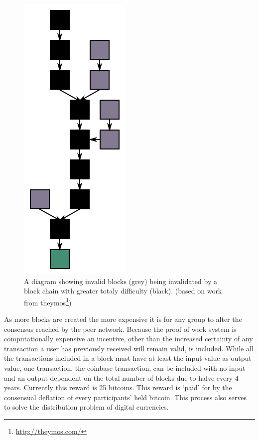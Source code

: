 \begin{figure}[t!]
    \centering
    \includegraphics[height=\columnwidth]{img/Blockchain}
    \caption{A diagram showing invalid blocks (grey) being invalidated by a block chain with greater totaly difficulty (black). (based on work from theymos\protect\footnote{\url{http://theymos.com/}})}
    \label{fig:blockchain}
\end{figure}

As more blocks are created the more expensive it is for any group to alter the consensus reached by the peer network.  Because the proof of work system is computationally expensive an incentive, other than the increased certainty of any transaction a user has previously received will remain valid, is included.  While all the transactions included in a block must have at least the input value as output value, one transaction, the coinbase transaction, can be included with no input and an output dependent on the total number of blocks due to halve every 4 years. Currently this reward is 25 bitcoins. This reward is `paid' for by the consensual deflation of every participants' held bitcoin. This process also serves to solve the distribution problem of digital currencies.

